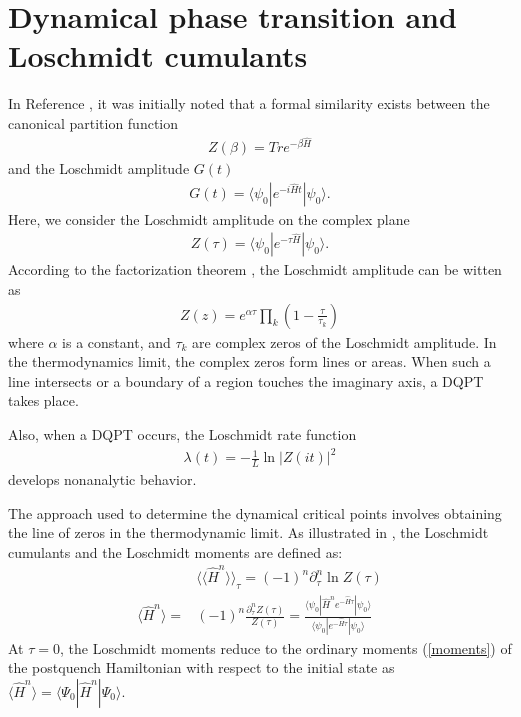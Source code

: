 \documentclass[%
reprint,
superscriptaddress,
amsmath,amssymb,
aps,
pra,
floatfix,
]{revtex4-1}
\begin{document}
\section{Dynamical phase transition and Loschmidt cumulants}
In Reference \cite{heyl2013}, it was initially noted that a formal similarity exists between the canonical partition function
\begin{align}
	Z(\beta)=Tr e^{-\beta \hat{H}}
\end{align}
and the Loschmidt amplitude $G(t)$
\begin{align}
	G(t)=\langle \psi_0|e^{-i\hat{H}t}|\psi_0 \rangle.
\end{align}
Here, we consider the Loschmidt amplitude on the complex plane
\begin{align}
	Z(\tau)=\langle \psi_0|e^{-\tau \hat{H}}|\psi_0 \rangle.
\end{align}
According to the factorization theorem \cite{george2013}, the Loschmidt amplitude can be witten as 
\begin{align}
	Z(z)=e^{\alpha \tau} \prod_k (1-\frac{\tau}{\tau_k})
	\label{factorization}
\end{align}
where $\alpha$ is a constant, and $\tau_k$ are complex zeros of the Loschmidt amplitude. In the thermodynamics limit, the complex zeros form lines or areas. When such a line intersects or a boundary of a region touches the imaginary axis, a DQPT takes place.

Also, when a DQPT occurs, the Loschmidt rate function
\begin{align}
	\lambda(t)=-\frac{1}{L}\ln|Z(it)|^2
\end{align}
develops nonanalytic behavior.

The approach used to determine the dynamical critical points involves obtaining the line of zeros in the thermodynamic limit. As illustrated in \cite{peotta2021}, the Loschmidt cumulants and the Loschmidt moments are defined as:
\begin{align}
	&\langle \langle \hat{H}^n \rangle \rangle_{\tau}=(-1)^n \partial^n_{\tau} \ln Z(\tau)  \\ 
	\langle \hat{H}^n \rangle =&(-1)^n\frac{\partial^n_{\tau} Z(\tau)}{Z(\tau)}=\frac{\langle \psi_0|\hat{H}^n e^{-\hat{H}\tau}|\psi_0 \rangle}{\langle \psi_0|e^{-\hat{H}\tau}|\psi_0 \rangle} \label{moments}
\end{align}
At $\tau=0$, the Loschmidt moments reduce to the ordinary moments (\ref{moments}) of the postquench Hamiltonian with respect to the initial state as $\langle \hat{H}^n\rangle =\langle \Psi_0| \hat{H}^n| \Psi_0\rangle$.
\end{document}
